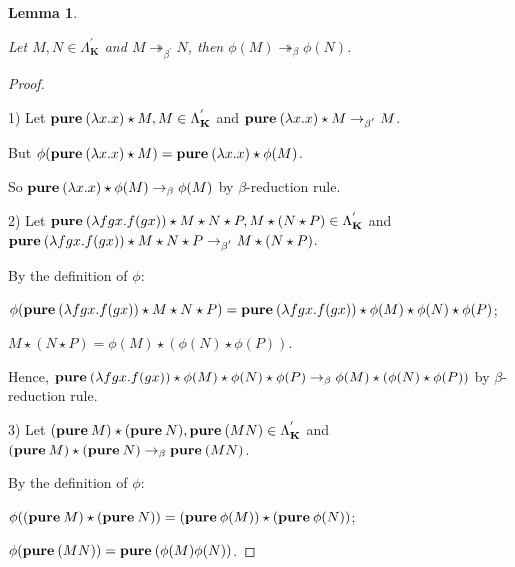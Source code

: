 \documentclass[a4paper]{article}
\newtheorem{lemma}{Lemma}
\begin{document}
\begin{lemma}

$ $

  Let $M, N \in \Lambda^{'}_{\textbf{K}}$ and $M \twoheadrightarrow_{\beta^{'}} N$, then $\phi(M)
  \twoheadrightarrow_{\beta} \phi(N)$.

\end{lemma}

\begin{proof}

$ $

1) Let ${\bf pure \: } (\lambda x. x) \star M, M \in \Lambda^{'}_{\textbf{K}}$ and ${\bf pure \: } (\lambda
x. x) \star M \rightarrow_{\beta^{'}} M$.

But $\phi ({\bf pure \: } (\lambda x. x) \star M) = {\bf pure \: } (\lambda x. x) \star \phi(M)$.\

So ${\bf pure \: } (\lambda x. x) \star \phi(M) \rightarrow_{\beta} \phi(M)$ by $\beta$-reduction rule.

\vspace{\baselineskip}

2) Let ${\bf pure \: } (\lambda f g x. f (g x)) \star M \star N \star P, M \star (N \star P) \in
\Lambda^{'}_{\textbf{K}}$ and ${\bf pure \: } (\lambda f g x. f (g x)) \star M \star N \star P
\rightarrow_{\beta^{'}} M \star (N \star P)$.

By the definition of $\phi$:

$\phi({\bf pure \: } (\lambda f g x. f (g x)) \star M \star N \star P) = {\bf pure \: } (\lambda f g x. f (g
x)) \star \phi(M) \star \phi(N) \star \phi(P)$;

$M \star (N \star P) = \phi(M) \star (\phi(N) \star \phi(P))$.

Hence, ${\bf pure \: } (\lambda f g x. f (g x))
\star \phi(M) \star \phi(N) \star \phi(P) \rightarrow_{\beta} \phi(M) \star (\phi(N) \star \phi(P))$ by
$\beta$-reduction rule.

\vspace{\baselineskip}

3) Let $({\bf pure \: } M) \star ({\bf pure \: } N), {\bf pure \: } (M N) \in \Lambda^{'}_{\textbf{K}}$ and
$({\bf pure \: } M) \star ({\bf pure \: } N) \rightarrow_{\beta} {\bf pure \: } (M N)$.

By the definition of $\phi$:

$\phi(({\bf pure \: } M) \star ({\bf pure \: } N)) = ({\bf pure \: } \phi(M)) \star ({\bf pure \: }
\phi(N))$;

$\phi({\bf pure \: } (M N)) = {\bf pure \: } (\phi(M) \phi(N))$.


\end{proof}
\end{document}
